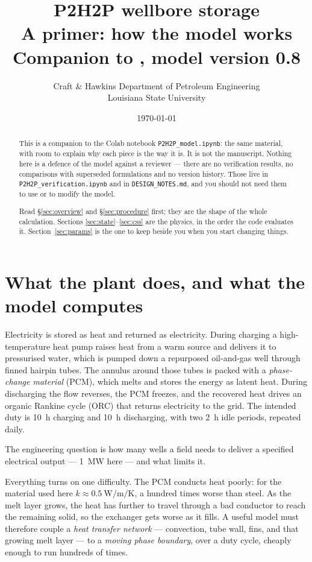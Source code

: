 \documentclass[11pt,a4paper]{article}
\title{\textbf{P2H2P wellbore storage}\\[4pt]
\large A primer: how the model works\\[8pt]
\normalsize Companion to \code{P2H2P\_model.ipynb}, model version 0.8}
\author{Craft \& Hawkins Department of Petroleum Engineering\\
Louisiana State University}
\date{\today}
\newcommand{\code}[1]{\texttt{\small #1}}
\begin{document}
\maketitle

\begin{abstract}
\noindent
This is a companion to the Colab notebook \code{P2H2P\_model.ipynb}: the same
material, with room to explain why each piece is the way it is. It is not the
manuscript. Nothing here is a defence of the model against a reviewer --- there
are no verification results, no comparisons with superseded formulations and no
version history. Those live in \code{P2H2P\_verification.ipynb} and in
\code{DESIGN\_NOTES.md}, and you should not need them to use or to modify the
model.

Read \S\ref{sec:overview} and \S\ref{sec:procedure} first; they are the shape
of the whole calculation. Sections \ref{sec:state}--\ref{sec:css} are the
physics, in the order the code evaluates it.
Section~\ref{sec:params} is the one to keep beside you when you start changing
things.
\end{abstract}

\tableofcontents

\section{What the plant does, and what the model computes}
\label{sec:overview}

Electricity is stored as heat and returned as electricity. During charging a
high-temperature heat pump raises heat from a warm source and delivers it to
pressurised water, which is pumped down a repurposed oil-and-gas well through
finned hairpin tubes. The annulus around those tubes is packed with a
\emph{phase-change material} (PCM), which melts and stores the energy as latent
heat. During discharging the flow reverses, the PCM freezes, and the recovered
heat drives an organic Rankine cycle (ORC) that returns electricity to the
grid. The intended duty is \SI{10}{\hour} charging and \SI{10}{\hour}
discharging, with two \SI{2}{\hour} idle periods, repeated daily.

The engineering question is how many wells a field needs to deliver a specified
electrical output --- \SI{1}{\mega\watt} here --- and what limits it.

Everything turns on one difficulty. The PCM conducts heat poorly: for the
material used here $k \approx \SI{0.5}{\watt\per\meter\per\kelvin}$, a hundred
times worse than steel. As the melt layer grows, the heat has further to travel
through a bad conductor to reach the remaining solid, so the exchanger gets
worse as it fills. A useful model must therefore couple a \emph{heat transfer
network} --- convection, tube wall, fins, and that growing melt layer --- to a
\emph{moving phase boundary}, over a duty cycle, cheaply enough to run hundreds
of times.
\end{document}
